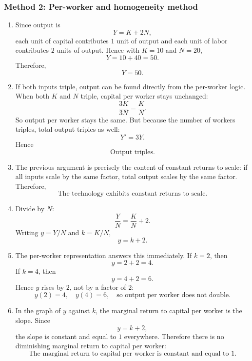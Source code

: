 \documentclass[12pt]{article}
\begin{document}
\subsubsection{Method 2: Per-worker and homogeneity method}
\begin{enumerate}[label=(\alph*)]
    \item
    Since output is
    \[
    Y=K+2N,
    \]
    each unit of capital contributes \(1\) unit of output and each unit of labor contributes \(2\) units of output. Hence with \(K=10\) and \(N=20\),
    \[
    Y=10+40=50.
    \]
    Therefore,
    \[
    \boxed{Y=50.}
    \]

    \item
    If both inputs triple, output can be found directly from the per-worker logic. When both \(K\) and \(N\) triple, capital per worker stays unchanged:
    \[
    \frac{3K}{3N}=\frac{K}{N}.
    \]
    So output per worker stays the same. But because the number of workers triples, total output triples as well:
    \[
    Y' = 3Y.
    \]
    Hence
    \[
    \boxed{\text{Output triples.}}
    \]

    \item
    The previous argument is precisely the content of constant returns to scale: if all inputs scale by the same factor, total output scales by the same factor. Therefore,
    \[
    \boxed{\text{The technology exhibits constant returns to scale.}}
    \]

    \item
    Divide by \(N\):
    \[
    \frac{Y}{N}=\frac{K}{N}+2.
    \]
    Writing \(y=Y/N\) and \(k=K/N\),
    \[
    \boxed{y=k+2.}
    \]

    \item
    The per-worker representation answers this immediately. If \(k=2\), then
    \[
    y=2+2=4.
    \]
    If \(k=4\), then
    \[
    y=4+2=6.
    \]
    Hence \(y\) rises by \(2\), not by a factor of \(2\):
    \[
    \boxed{y(2)=4,\quad y(4)=6,\quad \text{so output per worker does not double.}}
    \]

    \item
    In the graph of \(y\) against \(k\), the marginal return to capital per worker is the slope. Since
    \[
    y=k+2,
    \]
    the slope is constant and equal to \(1\) everywhere. Therefore there is no diminishing marginal return to capital per worker:
    \[
    \boxed{\text{The marginal return to capital per worker is constant and equal to }1.}
    \]


\end{enumerate}
\end{document}
